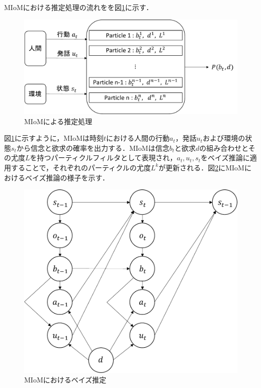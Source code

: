 \par
MIoMにおける推定処理の流れをを図\ref{fig:sys_arc}に示す．
\begin{figure}[htbp]
  \begin{center}
    \includegraphics[scale=0.85]{./bt1.pdf}
    \caption{MIoMによる推定処理}
    \label{fig:sys_arc}
  \end{center}
\end{figure}
図\ref{fig:sys_arc}に示すように，MIoMは時刻$t$における人間の行動$a_t$，発話$u_t$および環境の状態$s_t$から信念と欲求の確率を出力する．MIoMは信念$b_t$と欲求$d$の組み合わせとその尤度$L$を持つパーティクルフィルタとして表現され，$a_t,u_t,s_t$をベイズ推論に適用することで，それぞれのパーティクルの尤度$L^k$が更新される．図\ref{fig:miom}にMIoMにおけるベイズ推論の様子を示す．
\begin{figure}[htbp]
  \begin{center}
    \includegraphics[scale=0.85]{./miom.pdf}
    \caption{MIoMにおけるベイズ推定}
    \label{fig:miom}
  \end{center}
\end{figure}
